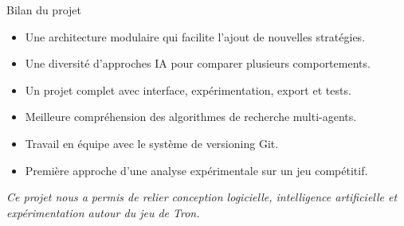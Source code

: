 \documentclass[10pt]{beamer}
\begin{document}
\begin{frame}{Bilan du projet}
    \begin{tcolorbox}[enhanced, arc=5pt, colback=softblue, colframe=team1color, title=Points forts]
        \begin{itemize}
            \item Une architecture modulaire qui facilite l'ajout de nouvelles stratégies.
            \item Une diversité d'approches IA pour comparer plusieurs comportements.
            \item Un projet complet avec interface, expérimentation, export et tests.
        \end{itemize}
    \end{tcolorbox}

    \begin{tcolorbox}[enhanced, arc=5pt, colback=softgreen, colframe=donecolor, title=Apports du projet]
        \begin{itemize}
            \item Meilleure compréhension des algorithmes de recherche multi-agents.
            \item Travail en équipe avec le système de versioning Git.
            \item Première approche d'une analyse expérimentale sur un jeu compétitif.
        \end{itemize}
    \end{tcolorbox}

    \vspace{0.3cm}
    \begin{center}
        \textit{Ce projet nous a permis de relier conception logicielle, intelligence artificielle et expérimentation autour du jeu de Tron.}
    \end{center}
\end{frame}
\end{document}

